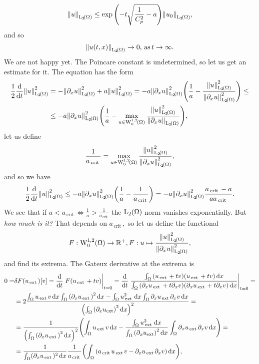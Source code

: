 \documentclass[../main.tex]{subfiles}
\begin{document}
\[
	\norm{u}_{\LpSet[2]{\Omega}}\leq \exp\qty(-t\sqrt{\frac{1}{C_p^{2}}-a})\norm{u_0}_{\LpSet[2]{\Omega}},
\]
and so
\[
	\norm{u(t,x)}_{\LpSet[2]{\Omega}} \to 0, \, \text{as} \, t\to \infty.
\]
We are not happy yet. The Poincare constant is undetermined, so let us get an estimate for it. The equation has the form
\begin{align*}
	\frac{1}{2}\dv{t} \norm{u}_{\LpSet[2]{\Omega}}^{2} &= - \norm{\partial_x u}_{\LpSet[2]{\Omega}}^{2}+a \norm{u}_{\LpSet[2]{\Omega}}^{2} = -a \norm{\partial_x u}_{\LpSet[2]{\Omega}}^{2}\qty(\frac{1}{a}-\frac{\norm{u}_{\LpSet[2]{\Omega}}^{2}}{\norm{\partial_x u}_{\LpSet[2]{\Omega}}^{2}}) \leq \\
	&\leq -a \norm{\partial_x u}_{\LpSet[2]{\Omega}}^{2}\qty(\frac{1}{a}-\max_{u \in \WkpzeroSet[1][2]{\Omega}}\frac{\norm{u}_{\LpSet[2]{\Omega}}^{2}}{\norm{\partial_x u}_{\LpSet[2]{\Omega}}}),
\end{align*}
let us define
\[
	\frac{1}{a_{\, \text{crit} \,}} = \max_{u \in \WkpzeroSet[1][2]{\Omega}}\frac{\norm{u}_{\LpSet[2]{\Omega}}^{2}}{\norm{\partial_x u}_{\LpSet[2]{\Omega}}^{2}},
\]
and so we have
\[
	\frac{1}{2}\dv{t}\norm{u}_{\LpSet[2]{\Omega}}^{2} \leq -a \norm{\partial_x u}_{\LpSet[2]{\Omega}}^{2}\qty(\frac{1}{a}-\frac{1}{a_{\, \text{crit} \,}}) = -a \norm{\partial_x u}_{\LpSet[2]{\Omega}}^{2} \frac{a_{\, \text{crit} \,}-a}{a a_{\, \text{crit} \,}}.
\]
We see that if $a < a_{\, \text{crit} \,} \Leftrightarrow \frac{1}{a} > \frac{1}{a_{\, \text{crit} \,}}$ the $\LpSet[2]{\Omega}$ norm vanishes exponentially.
But \textit{how much is it?} That depends on $a_{\, \text{crit} \,},$ so let us define the functional
\[
	F: \WkpzeroSet[1][2]{\Omega} \to \R^+, F: u \mapsto \frac{\norm{u}_{\LpSet[2]{\Omega}}^{2}}{\norm{\partial_x u}_{\LpSet[2]{\Omega}}^{2}},
\]
and find its extrema. The Gateux derivative at the extrema is
\begin{align*}
	0 = &\delta F\qty(u_{\, \text{ext} \,})[v] = \dv{t} \eval{F\qty(u_{\, \text{ext} \,} + t v)}_{t=0} = \dv{t} \eval{\frac{\int_{\Omega}\qty(u_{\, \text{ext} \,}+tv)\qty(u_{\, \text{ext} \,}+tv)\dd{x}}{\int_{\Omega}\qty(\partial_x u_{\, \text{ext} \,}+t \partial_x v)\qty(\partial_x u_{\, \text{ext} \,}+t \partial_xv)\dd{x}}}_{t=0} =\\
	    & = 2\frac{\int_{\Omega}u_{\, \text{ext} \,}v\dd{x}\int_{\Omega}\qty(\partial_x u_{\, \text{ext} \,})^{2}\dd{x} - \int_{\Omega}u_{\, \text{ext} \,}^{2}\dd{x}\int_{\Omega}\partial_x u_{\, \text{ext} \,} \partial_x v\dd{x}}{\qty(\int_{\Omega}\qty(\partial_x u_{\text{ext}})^{2}\dd{x})^{2}} = \\
	    & = \frac{1}{\qty(\int_{\Omega}\qty(\partial_x u_{\, \text{ext} \,})^{2}\dd{x})^{2}}\qty(\int_{\Omega}u_{\, \text{ext} \,}v\dd{x}-\frac{\int_{\Omega}u_{\, \text{ext} \,}^{2}\dd{x}}{\int_{\Omega}\qty(\partial_x u_{\text{ext}})^{2}\dd{x}} \int_{\Omega}\partial_x u_{\, \text{ext} \,} \partial_x v\dd{x}) =\\
	    &=\frac{1}{\int_{\Omega} (\partial_x u_{\, \text{ext} \,})^{2}\dd{x}} \frac{1}{a_{\, \text{crit} \,}}\qty(\int_{\Omega}\qty(a_{\, \text{crit} \,}u_{\, \text{ext} \,}v - \partial_x u_{\, \text{ext} \,}\partial_x v)\dd{x}),
\end{align*}
\end{document}
